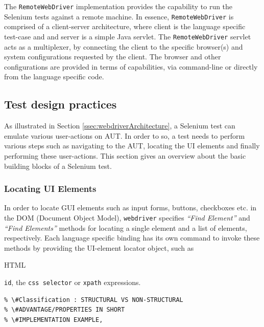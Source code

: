 The \texttt{RemoteWebDriver} implementation provides the capability to run the Selenium tests against a remote machine. In essence, \texttt{RemoteWebDriver} is comprised of a client-server architecture, where client is the language specific test-case and and server is a simple Java servlet. The \texttt{RemoteWebDriver} servlet acts as a multiplexer, by connecting the client to the specific browser(s) and system configurations requested by the client. The browser and other configurations are provided in terms of capabilities, via command-line or directly from the language specific code.
\subsection{Test design practices}
\label{testDesignPractices}
As illustrated in Section \ref{ssec:webdriverArchitecture}, a Selenium test can emulate various user-actions on AUT. In order to so, a test needs to perform various steps such as navigating to the AUT, locating the UI elements and finally performing these user-actions. This section gives an overview about the basic building blocks of a Selenium test. 
\subsubsection*{Locating UI Elements}
\label{ssec:locatingUIElements}
In order to locate GUI elements such as input forms, buttons, checkboxes etc. in the DOM (Document Object Model), \texttt{webdriver} specifies \textit{``Find Element''} and \textit{``Find Elements''} methods for locating a single element and a list of elements, respectively. 
Each language specific binding has its own command to invoke these methods by providing the UI-element locator object, such as\begin{small} HTML\end{small} \texttt{id}, the \texttt{css selector} or \texttt{xpath} expressions.

\begin{verbatim}
% \#Classification : STRUCTURAL VS NON-STRUCTURAL
% \#ADVANTAGE/PROPERTIES IN SHORT
% \#IMPLEMENTATION EXAMPLE,
\end{verbatim}

